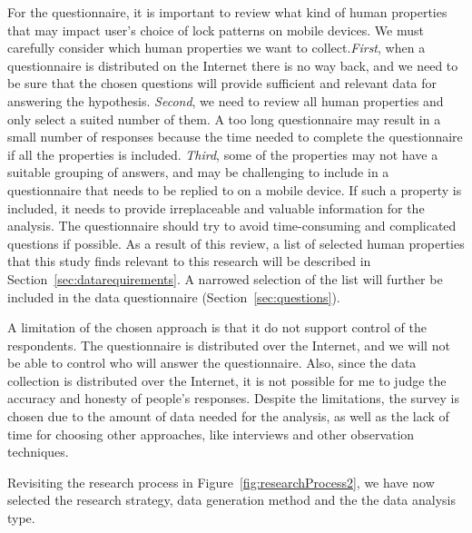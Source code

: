   For the questionnaire, it is important to review what kind of human properties that may impact user's choice of lock patterns on mobile devices. We must carefully consider which human properties we want to collect.{\it First}, when a questionnaire is distributed on the Internet there is no way back, and we need to be sure that the chosen questions will provide sufficient and relevant data for answering the hypothesis. {\it Second}, we need to review all human properties and only select a suited number of them. A too long questionnaire may result in a small number of responses because the time needed to complete the questionnaire if all the properties is included. {\it Third}, some of the properties may not have a suitable grouping of answers, and may be challenging to include in a questionnaire that needs to be replied to on a mobile device. If such a property is included, it needs to provide irreplaceable and valuable information for the analysis. The questionnaire should try to avoid time-consuming and complicated questions if possible. As a result of this review, a list of selected human properties that this study finds relevant to this research will be described in Section~\ref{sec:datarequirements}. A narrowed selection of the list will further be included in the data questionnaire (Section~\ref{sec:questions}).  
  
  A limitation of the chosen approach is that it do not support control of the respondents. The questionnaire is distributed over the Internet, and we will not be able to control who will answer the questionnaire. Also, since the data collection is distributed over the Internet, it is not possible for me to judge the accuracy and honesty of people's responses. Despite the limitations, the survey is chosen due to the amount of data needed for the analysis, as well as the lack of time for choosing other approaches, like interviews and other observation techniques. 

  Revisiting the research process in Figure~\ref{fig:researchProcess2}, we have now selected the research strategy, data generation method and the the data analysis type. 

